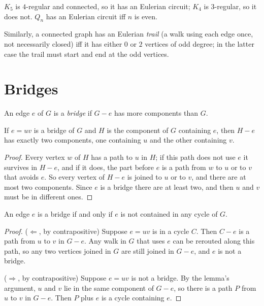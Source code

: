 \begin{example}
$K_5$ is $4$-regular and connected, so it has an Eulerian circuit; $K_4$ is $3$-regular, so it
does not. $Q_n$ has an Eulerian circuit iff $n$ is even.
\end{example}

\begin{aside}
Similarly, a connected graph has an Eulerian \emph{trail} (a walk using each edge once, not
necessarily closed) iff it has either $0$ or $2$ vertices of odd degree; in the latter case the
trail must start and end at the odd vertices.
\end{aside}

\section{Bridges}

\begin{definition}[Bridge]
An edge $e$ of $G$ is a \emph{bridge} if $G - e$ has more components than $G$.
\end{definition}

\begin{lemma}
If $e = uv$ is a bridge of $G$ and $H$ is the component of $G$ containing $e$, then $H - e$ has
exactly two components, one containing $u$ and the other containing $v$.
\end{lemma}
\begin{proof}
Every vertex $w$ of $H$ has a path to $u$ in $H$; if this path does not use $e$ it survives in
$H - e$, and if it does, the part before $e$ is a path from $w$ to $u$ or to $v$ that avoids $e$.
So every vertex of $H - e$ is joined to $u$ or to $v$, and there are at most two components.
Since $e$ is a bridge there are at least two, and then $u$ and $v$ must be in different ones.
\end{proof}

\begin{theorem}
An edge $e$ is a bridge if and only if $e$ is not contained in any cycle of $G$.
\end{theorem}
\begin{proof}
($\Leftarrow$, by contrapositive) Suppose $e = uv$ is in a cycle $C$. Then $C - e$ is a path from
$u$ to $v$ in $G - e$. Any walk in $G$ that uses $e$ can be rerouted along this path, so any two
vertices joined in $G$ are still joined in $G - e$, and $e$ is not a bridge.

($\Rightarrow$, by contrapositive) Suppose $e = uv$ is not a bridge. By the lemma's argument,
$u$ and $v$ lie in the same component of $G - e$, so there is a path $P$ from $u$ to $v$ in
$G - e$. Then $P$ plus $e$ is a cycle containing $e$.
\end{proof}

